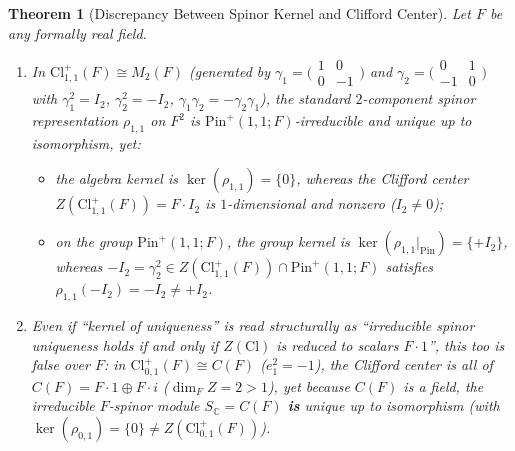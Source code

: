 \documentclass[11pt,a4paper]{article}
\theoremstyle{plain}
\newtheorem{theorem}{Theorem}[section]
\theoremstyle{definition}
\newcommand{\Cl}{\mathrm{Cl}}
\newcommand{\Pin}{\mathrm{Pin}}
\newcommand{\C}{\mathbb{C}}
\begin{document}
\begin{theorem}[Discrepancy Between Spinor Kernel and Clifford Center]
\label{thm:kernel-center}
Let $F$ be any formally real field.
\begin{enumerate}
\item[(i)] In $\Cl_{1,1}^+(F) \cong M_2(F)$ (generated by $\gamma_1 = \bigl(\begin{smallmatrix}1 & 0\\ 0 & -1\end{smallmatrix}\bigr)$ and $\gamma_2 = \bigl(\begin{smallmatrix}0 & 1\\ -1 & 0\end{smallmatrix}\bigr)$ with $\gamma_1^2 = I_2$, $\gamma_2^2 = -I_2$, $\gamma_1\gamma_2 = -\gamma_2\gamma_1$), the standard $2$-component spinor representation $\rho_{1,1}$ on $F^2$ is $\Pin^+(1,1;F)$-irreducible and unique up to isomorphism, yet:
\begin{itemize}
\item the algebra kernel is $\ker(\rho_{1,1}) = \{0\}$, whereas the Clifford center $Z(\Cl_{1,1}^+(F)) = F \cdot I_2$ is $1$-dimensional and nonzero ($I_2 \neq 0$);
\item on the group $\Pin^+(1,1;F)$, the group kernel is $\ker(\rho_{1,1}|_{\Pin}) = \{+I_2\}$, whereas $-I_2 = \gamma_2^2 \in Z(\Cl_{1,1}^+(F)) \cap \Pin^+(1,1;F)$ satisfies $\rho_{1,1}(-I_2) = -I_2 \neq +I_2$.
\end{itemize}
\item[(ii)] Even if ``kernel of uniqueness'' is read structurally as ``irreducible spinor uniqueness holds if and only if $Z(\Cl)$ is reduced to scalars $F \cdot 1$'', this too is false over $F$: in $\Cl_{0,1}^+(F) \cong C(F)$ ($e_1^2 = -1$), the Clifford center is all of $C(F) = F \cdot 1 \oplus F \cdot i$ ($\dim_F Z = 2 > 1$), yet because $C(F)$ is a field, the irreducible $F$-spinor module $S_{\C} = C(F)$ \textbf{is} unique up to isomorphism (with $\ker(\rho_{0,1}) = \{0\} \neq Z(\Cl_{0,1}^+(F))$).
\end{enumerate}
\end{theorem}
\end{document}
